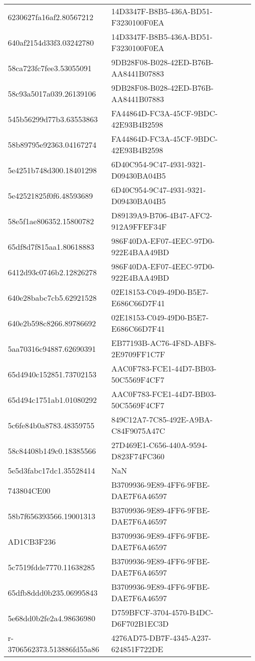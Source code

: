 \begin{tabular}{ll}
6230627fa16af2.80567212 & 14D3347F-B8B5-436A-BD51-F3230100F0EA \\
640af2154d33f3.03242780 & 14D3347F-B8B5-436A-BD51-F3230100F0EA \\
58ca723fc7fee3.53055091 & 9DB28F08-B028-42ED-B76B-AA8441B07883 \\
58c93a5017a039.26139106 & 9DB28F08-B028-42ED-B76B-AA8441B07883 \\
545b56299d77b3.63553863 & FA44864D-FC3A-45CF-9BDC-42E93B4B2598 \\
58b89795e92363.04167274 & FA44864D-FC3A-45CF-9BDC-42E93B4B2598 \\
5e4251b748d300.18401298 & 6D40C954-9C47-4931-9321-D09430BA04B5 \\
5e42521825f0f6.48593689 & 6D40C954-9C47-4931-9321-D09430BA04B5 \\
58e5f1ae806352.15800782 & D89139A9-B706-4B47-AFC2-912A9FFEF34F \\
65df8d7f815aa1.80618883 & 986F40DA-EF07-4EEC-97D0-922E4BAA49BD \\
6412d93c0746b2.12826278 & 986F40DA-EF07-4EEC-97D0-922E4BAA49BD \\
640e28babc7cb5.62921528 & 02E18153-C049-49D0-B5E7-E686C66D7F41 \\
640e2b598c8266.89786692 & 02E18153-C049-49D0-B5E7-E686C66D7F41 \\
5aa70316c94887.62690391 & EB77193B-AC76-4F8D-ABF8-2E9709FF1C7F \\
65d4940c152851.73702153 & AAC0F783-FCE1-44D7-BB03-50C5569F4CF7 \\
65d494c1751ab1.01080292 & AAC0F783-FCE1-44D7-BB03-50C5569F4CF7 \\
5c6fe84b0a8783.48359755 & 849C12A7-7C85-492E-A9BA-C84F9075A47C \\
58c84408b149c0.18385566 & 27D469E1-C656-440A-9594-D823F74FC360 \\
5e5d3fabc17dc1.35528414 & NaN \\
743804CE00 & B3709936-9E89-4FF6-9FBE-DAE7F6A46597 \\
58b7f656393566.19001313 & B3709936-9E89-4FF6-9FBE-DAE7F6A46597 \\
AD1CB3F236 & B3709936-9E89-4FF6-9FBE-DAE7F6A46597 \\
5c7519fdde7770.11638285 & B3709936-9E89-4FF6-9FBE-DAE7F6A46597 \\
65dfb8ddd0b235.06995843 & B3709936-9E89-4FF6-9FBE-DAE7F6A46597 \\
5e68dd0b2fe2a4.98636980 & D759BFCF-3704-4570-B4DC-D6F702B1EC3D \\
r-3706562373.513886fd55a86 & 4276AD75-DB7F-4345-A237-624851F722DE \\

\end{tabular}
